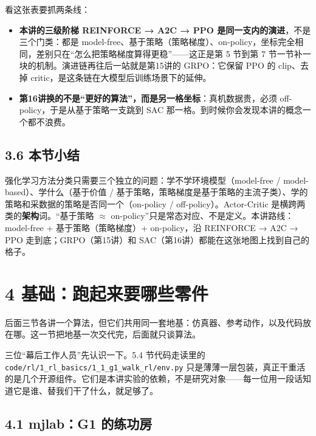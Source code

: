 \documentclass[
  chinese,
]{ctexart}
\providecommand{\tightlist}{%
  \setlength{\itemsep}{0pt}\setlength{\parskip}{0pt}}
\begin{document}
看这张表要抓两条线：

\begin{itemize}
\tightlist
\item
  \textbf{本讲的三级阶梯 REINFORCE → A2C → PPO
  是同一支内的演进}，不是三个门类：都是
  model-free、基于策略（策略梯度）、on-policy，坐标完全相同，差别只在``怎么把策略梯度算得更稳''------这正是第
  5 节到第 7 节一节补一块的机制。演进链再往后一站就是第15讲的
  GRPO：它保留 PPO 的 clip、去掉
  critic，是这条链在大模型后训练场景下的延伸。
\item
  \textbf{第16讲换的不是``更好的算法''，而是另一格坐标}：真机数据贵，必须
  off-policy，于是从基于策略一支跳到 SAC
  那一格。到时候你会发现本讲的概念一个都不浪费。
\end{itemize}

\subsection{3.6 本节小结}\label{ux672cux8282ux5c0fux7ed3-1}

强化学习方法分类只需要三个独立的问题：学不学环境模型（model-free /
model-based）、学什么（基于价值 /
基于策略，策略梯度是基于策略的主流子类）、学的策略和采数据的策略是否同一个（on-policy
/ off-policy）。Actor-Critic 是横跨两类的\textbf{架构}词。``基于策略
\(\approx\) on-policy''只是常态对应、不是定义。本讲路线：model-free +
基于策略（策略梯度）+ on-policy，沿 REINFORCE → A2C → PPO
走到底；GRPO（第15讲）和 SAC（第16讲）都能在这张地图上找到自己的格子。

\section{4
基础：跑起来要哪些零件}\label{ux57faux7840ux8dd1ux8d77ux6765ux8981ux54eaux4e9bux96f6ux4ef6}

后面三节各讲一个算法，但它们共用同一套地基：仿真器、参考动作，以及代码放在哪。这一节把地基一次交代完，后面就只谈算法。

三位``幕后工作人员''先认识一下。5.4 节代码走读里的
\texttt{code/rl/1\_rl\_basics/1\_1\_g1\_walk\_rl/env.py}
只是薄薄一层包装，真正干重活的是几个开源组件。它们是本讲实验的依赖，不是研究对象------每一位用一段话知道它是谁、替我们干了什么，就足够了。

\subsection{4.1 mjlab：G1
的练功房}\label{mjlabg1-ux7684ux7ec3ux529fux623f}
\end{document}
